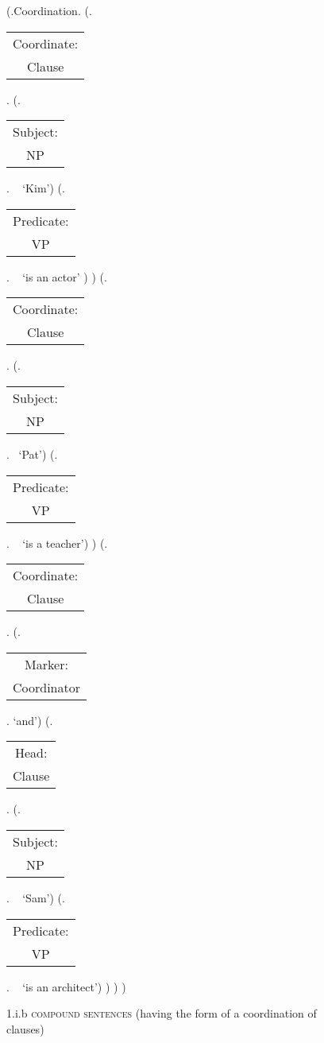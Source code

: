 \documentclass[12pt,letterpaper]{article}
\begin{document}
\begin{figure}
	\begin{center}
		\begin{parsetree}
			(.Coordination.
			(.\begin{tabular}{c}Coordinate:\\Clause\end{tabular}. 
			(.\begin{tabular}{c}Subject:\\NP\end{tabular}. ~ `Kim')
			(.\begin{tabular}{c}Predicate:\\VP\end{tabular}.   ~ `is an actor' )
			)
			(.\begin{tabular}{c}Coordinate:\\Clause\end{tabular}. 
			(.\begin{tabular}{c}Subject:\\NP\end{tabular}. ~`Pat')
			(.\begin{tabular}{c}Predicate:\\VP\end{tabular}. ~ `is a teacher')
			)
			(.\begin{tabular}{c}Coordinate:\\Clause\end{tabular}. 
			(.\begin{tabular}{c}Marker:\\Coordinator\end{tabular}.  `and')
			(.\begin{tabular}{c}Head:\\Clause\end{tabular}. 
			(.\begin{tabular}{c}Subject:\\NP\end{tabular}.  ~ `Sam')
			(.\begin{tabular}{c}Predicate:\\VP\end{tabular}. ~ `is an architect')
			)
			)
			)
			
			\hfill \break\hfill \break
		\end{parsetree}
		1.i.b \textsc{compound sentences} (having the form of a coordination of clauses)
	\end{center}
\end{figure}
\end{document}
